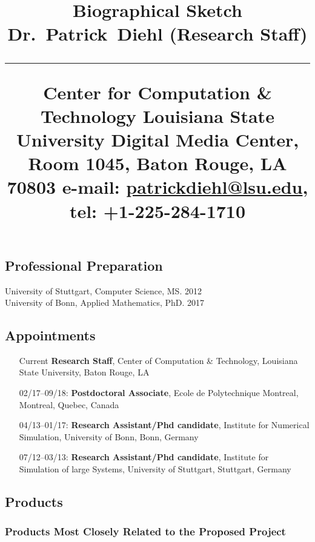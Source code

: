 \documentclass[svgnames,11pt]{article}
\title{%
        \vspace{-2\baselineskip}
            \normalsize
            Biographical Sketch\\
            {\large\textbf{Dr.~Patrick~Diehl (Research Staff)}}\\
            \vspace{0.5\baselineskip}
            \hrule
            \vspace{0.5\baselineskip}
            Center for Computation \& Technology
Louisiana State University
Digital Media Center, Room 1045, Baton Rouge, LA  70803
            e-mail: \href{mailto:patrickdiehl@lsu.edu}{patrickdiehl@lsu.edu},
            tel: +1-225-284-1710
        \vspace{-1.5ex}
        }
\date{}
\author{}
\begin{document}
\maketitle
\vspace{-4\baselineskip}

\subsection{Professional Preparation}

    University of Stuttgart,  Computer Science, MS. 2012
        \\
    University of Bonn, Applied Mathematics,  PhD. 2017

\subsection{Appointments}

\begin{itemize}[label={--9999:},leftmargin=*,itemsep=0pt]

    \item[Current]
        \textbf{Research Staff},
        Center of Computation \& Technology, Louisiana State University,
        Baton Rouge, LA
    \item[02/17--09/18:]
        \textbf{Postdoctoral Associate},
        Ecole de Polytechnique Montreal,
        Montreal, Quebec, Canada
    \item[04/13--01/17:]
        \textbf{Research Assistant/Phd candidate},
        Institute for Numerical Simulation, University of Bonn, Bonn, Germany
    \item[07/12--03/13:]
        \textbf{Research Assistant/Phd candidate},
        Institute for Simulation of large Systems, University of Stuttgart, Stuttgart, Germany
\end{itemize}

\subsection{Products}

\subsubsection{Products Most Closely Related to the Proposed Project}
\end{document}
